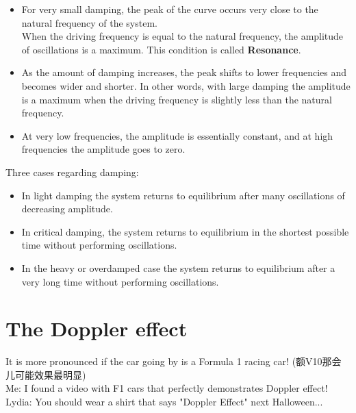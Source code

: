 \begin{itemize}
  \item For very small damping, the peak of the curve occurs very close to the natural frequency of the system.\\
  When the driving frequency is equal to the natural frequency, the amplitude of oscillations is a maximum. This condition is called \textbf{Resonance}.
  \item As the amount of damping increases, the peak shifts to lower frequencies and becomes wider and shorter.
In other words, with large damping the amplitude is a maximum when the driving frequency is slightly less
than the natural frequency.
  \item At very low frequencies, the amplitude is essentially constant, and at high frequencies the amplitude goes
to zero.
\end{itemize}
Three cases regarding damping:
\begin{itemize}
  \item In light damping the system returns to
equilibrium after many oscillations of decreasing amplitude.
  \item In critical damping, the system returns to
equilibrium in the shortest possible time without performing oscillations.
  \item In the heavy or overdamped
case the system returns to equilibrium after a very long time without performing oscillations.
\end{itemize}
\newpage
\section{The Doppler effect}
It is more pronounced if the car going by is a Formula 1 racing car! (额V10那会儿可能效果最明显)\\
Me: I found a video with F1 cars that perfectly demonstrates Doppler effect! \\Lydia: You should wear a shirt that says "Doppler Effect" next Halloween...
